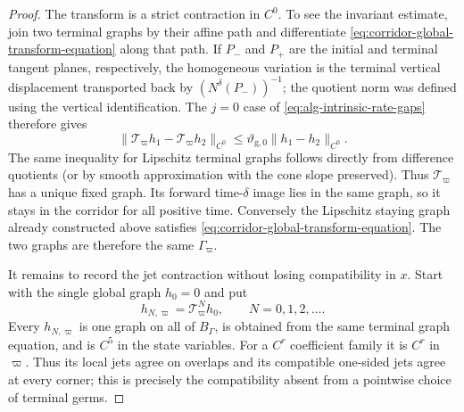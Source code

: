 \documentclass[11pt]{amsart}
\numberwithin{equation}{section}
\theoremstyle{definition}
\theoremstyle{remark}
\begin{document}
\begin{proof}
The transform is a strict contraction in $C^0$.  To see the invariant
estimate, join two terminal graphs by their affine path and differentiate
\eqref{eq:corridor-global-transform-equation} along that path.  If $P_-$
and $P_+$ are the initial and terminal tangent planes, respectively, the
homogeneous variation is the terminal vertical displacement transported
back by $(N^\delta(P_-))^{-1}$; the quotient norm was defined using the
vertical identification.  The $j=0$ case of
\eqref{eq:alg-intrinsic-rate-gaps} therefore gives
\begin{equation}\label{eq:corridor-c0-transform-contraction}
 \|\mathcal T_\varpi h_1-\mathcal T_\varpi h_2\|_{C^0}
 \le \vartheta_{\mathrm g,0}\|h_1-h_2\|_{C^0}.
\end{equation}
The same inequality for Lipschitz terminal graphs follows directly from
difference quotients (or by smooth approximation with the cone slope
preserved).
Thus $\mathcal T_\varpi$ has a unique fixed graph.  Its forward
time-$\delta$ image lies in the same graph, so it stays in the corridor for
all positive time.  Conversely the Lipschitz staying graph already
constructed above satisfies \eqref{eq:corridor-global-transform-equation}.
The two graphs are therefore the same $\Gamma_\varpi$.

It remains to record the jet contraction without losing compatibility in
$x$.  Start with the single global graph $h_0=0$ and put
\begin{equation}\label{eq:corridor-finite-horizon-graphs}
 h_{N,\varpi}=\mathcal T_\varpi^N h_0,
 \qquad N=0,1,2,\ldots.
\end{equation}
Every $h_{N,\varpi}$ is one graph on all of $B_\Gamma$, is obtained from
the same terminal graph equation, and is $C^5$ in the state variables.
For a $C^r$ coefficient family it is $C^r$ in $\varpi$.  Thus its local
jets agree on overlaps and its compatible one-sided jets agree at every
corner; this is precisely the compatibility absent from a pointwise choice
of terminal germs.


\end{proof}
\end{document}
